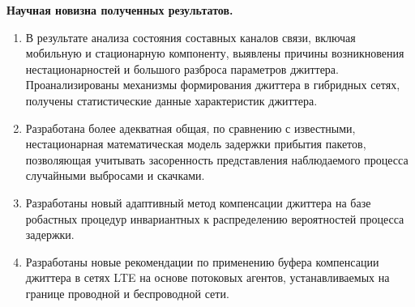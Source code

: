 \textbf{Научная новизна полученных результатов.} 
\begin{enumerate}
  \item В результате анализа состояния составных каналов связи, включая мобильную и стационарную компоненту, выявлены причины возникновения нестационарностей и большого разброса параметров джиттера.
  Проанализированы механизмы формирования джиттера в гибридных сетях, получены статистические данные характеристик джиттера.
  
 

  \item Разработана более адекватная общая, по сравнению с известными, нестационарная математическая модель задержки прибытия пакетов,
  позволяющая учитывать засоренность представления наблюдаемого процесса случайными выбросами и скачками.
  \item 
  Разработаны новый адаптивный метод компенсации джиттера на базе робастных процедур инвариантных к распределению вероятностей процесса задержки.
  \item 
  Разработаны новые рекомендации по применению буфера компенсации джиттера в сетях LTE на основе потоковых агентов, устанавливаемых на границе проводной и беспроводной сети.
\end{enumerate}

